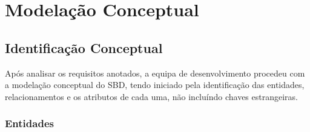 \documentclass[a4paper,12pt]{scrreprt}
\begin{document}
    \section{Modela\c{c}\~ao Conceptual}
        \subsection{Identificação Conceptual}
             Após analisar os requisitos anotados, a equipa de desenvolvimento procedeu com a 
             modelação conceptual do SBD, tendo iniciado pela identificação das entidades,
             relacionamentos e os atributos de cada uma, não incluíndo chaves estrangeiras.
             \subsubsection{Entidades}
\end{document}
